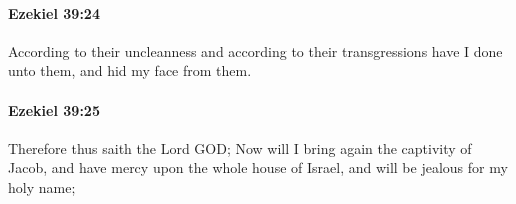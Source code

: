 		\paragraph{Ezekiel 39:24} %
			\label{EZEKIEL-39-24}

			According to their uncleanness and according to their transgressions have I done unto them, and hid my face from them.


		\paragraph{Ezekiel 39:25} %
			\label{EZEKIEL-39-25}

			Therefore thus saith the Lord GOD; Now will I bring again the captivity of Jacob, and have mercy upon the whole house of Israel, and will be jealous for my holy name;


